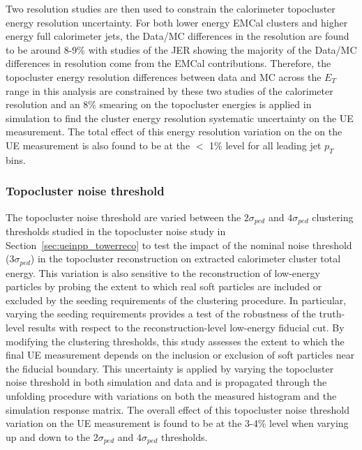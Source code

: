 Two resolution studies are then used to constrain the calorimeter topocluster energy resolution uncertainty.
For both lower energy EMCal clusters and higher energy full calorimeter jets, the Data/MC differences in the resolution are found to be around 8-9\% with studies of the JER showing the majority of the Data/MC differences in resolution come from the EMCal contributions.
Therefore, the topocluster energy resolution differences between data and MC across the $E_{T}$ range in this analysis  are constrained by these two studies of the calorimeter resolution and an 8\% smearing on the topocluster energies is applied in simulation to find the cluster energy resolution systematic uncertainty on the UE measurement.
The total effect of this energy resolution variation on the on the UE measurement is also found to be at the $<$ 1\% level for all leading jet $p_T$ bins.

\subsubsection{Topocluster noise threshold}
The topocluster noise threshold are varied between the $2\sigma_{ped}$ and $4\sigma_{ped}$ clustering thresholds studied in the topocluster noise study in Section~\ref{sec:ueinpp_towerreco} to test the impact of the nominal noise threshold ($3\sigma_{ped}$) in the topocluster reconstruction on extracted calorimeter cluster total energy.
This variation is also sensitive to the reconstruction of low-energy particles by probing the extent to which real soft particles are included or excluded by the seeding requirements of the clustering procedure. 
In particular, varying the seeding requirements provides a test of the robustness of the truth-level results with respect to the reconstruction-level low-energy fiducial cut. 
By modifying the clustering thresholds, this study assesses the extent to which the final UE measurement depends on the inclusion or exclusion of soft particles near the fiducial boundary.
This uncertainty is applied by varying the topocluster noise threshold in both simulation and data and is propagated through the unfolding procedure with variations on both the measured histogram and the simulation response matrix.
The overall effect of this topocluster noise threshold variation on the UE measurement is found to be at the 3-4\% level when varying up and down to the $2\sigma_{ped}$ and $4\sigma_{ped}$ thresholds.

